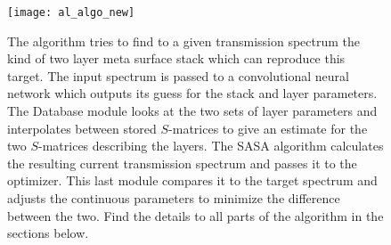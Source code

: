 \begin{figure}[H]
    \centering
    \texttt{[image: al\_algo\_new]}
    \caption[]{The algorithm tries to find to a given transmission spectrum the kind of two layer meta surface stack which can reproduce this target. The input spectrum is passed to a convolutional neural network which outputs its guess for the stack and layer parameters. The Database module looks at the two sets of layer parameters and interpolates between stored $S$-matrices to give an estimate for the two $S$-matrices describing the layers. The SASA algorithm calculates the resulting current transmission spectrum and passes it to the optimizer. This last module compares it to the target spectrum and adjusts the continuous parameters to minimize the difference between the two. Find the details to all parts of the algorithm in the sections below.}
    \label{fig:al:algo}
\end{figure}
\vspace{0.2cm}

